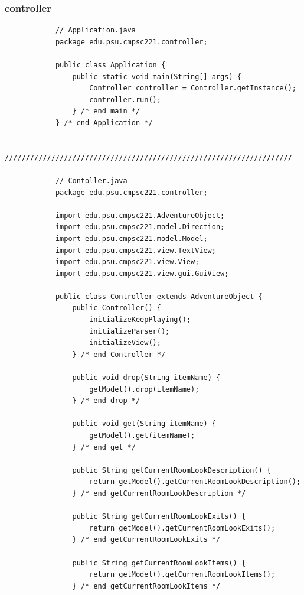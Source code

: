 \documentclass[a4paper, 11pt]{article}
\begin{document}
        \subsubsection{controller}
            \begin{lstlisting}
            // Application.java
            package edu.psu.cmpsc221.controller;

            public class Application {
                public static void main(String[] args) {
                    Controller controller = Controller.getInstance();
                    controller.run();
                } /* end main */
            } /* end Application */

            ////////////////////////////////////////////////////////////////////

            // Contoller.java
            package edu.psu.cmpsc221.controller;

            import edu.psu.cmpsc221.AdventureObject;
            import edu.psu.cmpsc221.model.Direction;
            import edu.psu.cmpsc221.model.Model;
            import edu.psu.cmpsc221.view.TextView;
            import edu.psu.cmpsc221.view.View;
            import edu.psu.cmpsc221.view.gui.GuiView;

            public class Controller extends AdventureObject {
                public Controller() {
                    initializeKeepPlaying();
                    initializeParser();
                    initializeView();
                } /* end Controller */

                public void drop(String itemName) {
                    getModel().drop(itemName);
                } /* end drop */

                public void get(String itemName) {
                    getModel().get(itemName);
                } /* end get */

                public String getCurrentRoomLookDescription() {
                    return getModel().getCurrentRoomLookDescription();
                } /* end getCurrentRoomLookDescription */

                public String getCurrentRoomLookExits() {
                    return getModel().getCurrentRoomLookExits();
                } /* end getCurrentRoomLookExits */

                public String getCurrentRoomLookItems() {
                    return getModel().getCurrentRoomLookItems();
                } /* end getCurrentRoomLookItems */


\end{lstlisting}
\end{document}
